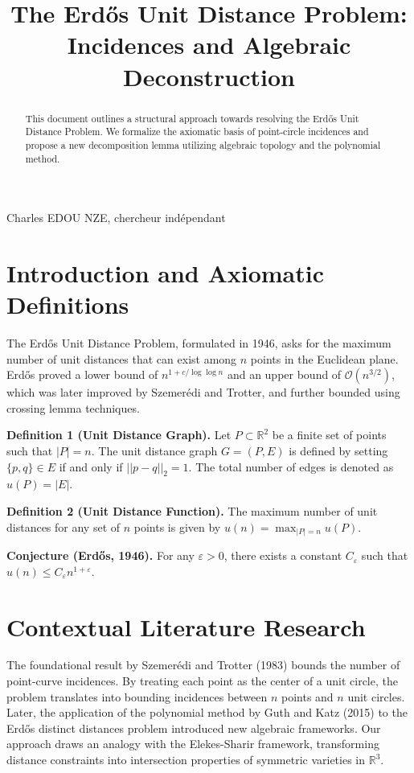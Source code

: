 \documentclass[11pt,a4paper]{article}
\title{The Erdős Unit Distance Problem: Incidences and Algebraic Deconstruction}
\author{}
\date{}
\begin{document}
\maketitle

\begin{abstract}
This document outlines a structural approach towards resolving the Erdős Unit Distance Problem. We formalize the axiomatic basis of point-circle incidences and propose a new decomposition lemma utilizing algebraic topology and the polynomial method.
\end{abstract}
\vfill
\noindent Charles EDOU NZE, chercheur indépendant
\newpage

\section{Introduction and Axiomatic Definitions}
The Erdős Unit Distance Problem, formulated in 1946, asks for the maximum number of unit distances that can exist among $n$ points in the Euclidean plane. Erdős proved a lower bound of $n^{1+c/\log\log n}$ and an upper bound of $\mathcal{O}(n^{3/2})$, which was later improved by Szemerédi and Trotter, and further bounded using crossing lemma techniques.

\textbf{Definition 1 (Unit Distance Graph).}
Let $P \subset \mathbb{R}^2$ be a finite set of points such that $|P| = n$. The unit distance graph $G = (P, E)$ is defined by setting $\{p, q\} \in E$ if and only if $||p - q||_2 = 1$. The total number of edges is denoted as $u(P) = |E|$.

\textbf{Definition 2 (Unit Distance Function).}
The maximum number of unit distances for any set of $n$ points is given by $u(n) = \max_{|P|=n} u(P)$.

\textbf{Conjecture (Erdős, 1946).}
For any $\varepsilon > 0$, there exists a constant $C_\varepsilon$ such that $u(n) \le C_\varepsilon n^{1+\varepsilon}$.

\section{Contextual Literature Research}
The foundational result by Szemerédi and Trotter (1983) bounds the number of point-curve incidences. By treating each point as the center of a unit circle, the problem translates into bounding incidences between $n$ points and $n$ unit circles.
Later, the application of the polynomial method by Guth and Katz (2015) to the Erdős distinct distances problem introduced new algebraic frameworks. Our approach draws an analogy with the Elekes-Sharir framework, transforming distance constraints into intersection properties of symmetric varieties in $\mathbb{R}^3$.
\end{document}

